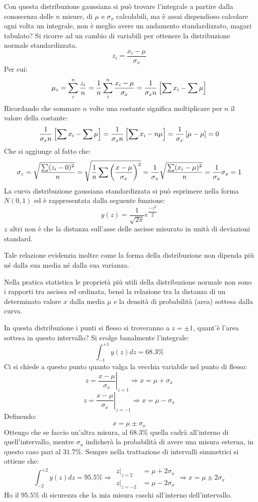 \documentclass[a4paper, 15pt]{article}
\begin{document}
\begin{adjustwidth}{2in}{}
\newpage	
	Con questa distribuzione gaussiana si può trovare l'integrale a partire dalla conoscenza delle $n$ misure, di $\mu$ e $\sigma_x$ calcolabili, ma è assai dispendioso calcolare ogni volta un integrale, non è meglio avere un andamento standardizzato, magari tabulato? Si ricorre ad un cambio di variabili per ottenere la distribuzione normale standardizzata.
	\[z_i = \dfrac{x_i-\mu}{\sigma_x}\]
	Per cui:
	\[\mu_z = \sum_{i}^{n}{z_i\over n} = {1\over n}\sum_{i}^{n}\dfrac{x_i-\mu}{\sigma_x} =  {1\over\sigma_xn}\left[\sum x_i - \sum\mu\right] \]
	Ricordando che sommare $n$ volte una costante significa moltiplicare per $n$ il valore della costante: 
	\[{1\over\sigma_xn}\left[\sum x_i - \sum\mu\right] = {1\over\sigma_xn}\left[\sum x_i - n\mu\right] = {1\over\sigma_x}\left[\mu - \mu\right] = 0\]
	Che si aggiunge al fatto che: 
	\[ \sigma_z = \sqrt{\dfrac{\sum(z_i - 0)^2}{n}} = \sqrt{{1\over n}\sum\left(\dfrac{x-\mu}{\sigma_x}\right)^2} = {1\over\sigma_x}\sqrt{\dfrac{\sum(x_i-\mu)^2}{n}} = {1\over\sigma_x}\sigma_x = 1 \]
	La curva distribuzione gaussiana standardizzata si può esprimere nella forma $N(0,1)$ ed è rappresentata dalla seguente funzione: 
	\[ y(z) = \dfrac{1}{\sqrt{2\pi}}e^{\dfrac{-z^2}{2}}\]
	$z$ altri non è che la distanza sull'asse delle ascisse misurato in unità di deviazioni standard. 
	
	Tale relazione evidenzia inoltre come la forma della distribuzione non dipenda più né dalla sua media né dalla sua varianza. \newline 
	
	Nella pratica statistica le proprietà più utili della distribuzione normale non sono i rapporti tra ascissa ed ordinata, bensì la relazione tra la distanza di un determinato valore $ x $ dalla media $\mu$ e la densità di probabilità (area) sottesa dalla curva. \newline 
	
	In questa distribuzione i punti si flesso si troveranno a $z = \pm 1$, quant'è l'area sottesa in questo intervallo? Si svolge banalmente l'integrale:
	\[\int_{-1}^{+1}y(z)dz = 68.3\%\]
	Ci si chiede a questo punto quanto valga la vecchia variabile nel punto di flesso: 
	\[z = \left.\dfrac{x-\mu}{\sigma_x}\right|_{z = 1} \Rightarrow x = \mu + \sigma_x\]
	\[z = \left.\dfrac{x-\mu}{\sigma_x}\right|_{z = -1} \Rightarrow x = \mu - \sigma_x\]
	Definendo:
	\[x = \mu \pm \sigma_x\]
	Ottengo che se faccio un'altra misura, al $ 68.3\% $ quella cadrà all'interno di quell'intervallo, mentre $\sigma_x$ indicherà la probabilità di avere una misura esterna, in questo caso pari al  $ 31.7\% $. 
\newpage	
	Sempre nella trattazione di intervalli simmetrici si ottiene che:
	\[\int_{-2}^{+2}y(z)dz = 95.5\% \Rightarrow \begin{aligned}
		\left.z\right|_{z = 2} & = \mu + 2\sigma_x \\
		\left.z\right|_{z = -2} & = \mu - 2\sigma_x 
	\end{aligned} \Rightarrow x = \mu \pm 2\sigma_x\]
	Ho il $ 95.5\% $ di sicurezza che la mia misura caschi all'interno dell'intervallo. \newline
	

\end{adjustwidth}
\end{document}
